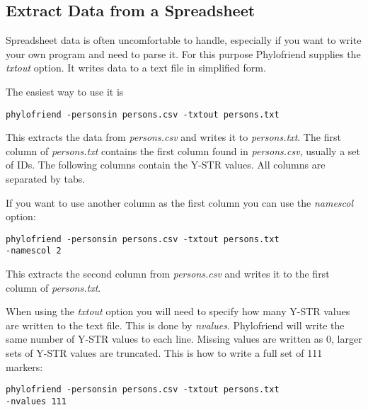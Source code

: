 \subsection{Extract Data from a Spreadsheet}

Spreadsheet data is often uncomfortable to handle, especially
if you want to write your own program and need to parse it.
For this purpose Phylofriend supplies the \emph{txtout}
option. It writes data to a text file in simplified form.

The easiest way to use it is

\noindent\texttt{phylofriend -personsin persons.csv -txtout persons.txt}

This extracts the data from \emph{persons.csv} and writes
it to \emph{persons.txt}. The first column of \emph{persons.txt}
contains the first column found in \emph{persons.csv}, usually
a set of IDs. The following columns contain the Y-STR values.
All columns are separated by tabs.

If you want to use another column as the first column you can
use the \emph{namescol} option:

\noindent\texttt{phylofriend -personsin persons.csv -txtout persons.txt\\
-namescol 2}

This extracts the second column from \emph{persons.csv} and
writes it to the first column of \emph{persons.txt}.

When using the \emph{txtout} option you will need to specify
how many Y-STR values are written to the text file. This is
done by \emph{nvalues}. Phylofriend will write the same number
of Y-STR values to each line. Missing values are written as
0, larger sets of Y-STR values are truncated. This is how to
write a full set of 111 markers:

\noindent\texttt{phylofriend -personsin persons.csv -txtout persons.txt\\
-nvalues 111}
















